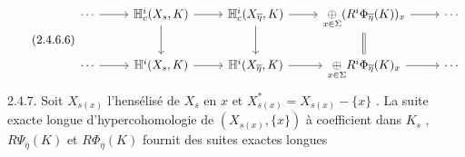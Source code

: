 \begin{equation}\tag{2.4.6.6}
\begin{tikzcd}
\cdots \arrow[r] & \mathbb{H}^i_c(X_s, K) \arrow[r] \arrow[d] & \mathbb{H}^i_c(X_{\overline{\eta}}, K) \arrow[r] \arrow[d] & \underset{x \in \Sigma}{\oplus} (R^i\Phi_{\overline{\eta}}(K))_x \arrow[r] \arrow[d, equal] & \cdots \\
\cdots \arrow[r] & \mathbb{H}^i(X_s, K) \arrow[r] & \mathbb{H}^i(X_{\overline{\eta}}, K) \arrow[r] & \underset{x \in \Sigma}{\oplus} R^i\Phi_{\overline{\eta}}(K)_x \arrow[r] & \cdots
\end{tikzcd}
\end{equation}
2.4.7.   Soit $X_{s(x)}$ l'hensélisé de $X_s$ en $x$ et $X^{*}_{s(x)} = X_{s(x)} - \{x\}$ . La suite exacte longue d'hypercohomologie de $(X_{s(x)}, \{x\})$ à coefficient dans $K_s$ , $R\Psi_{\overline{\eta}}(K)$ et $R\Phi_{\overline{\eta}}(K)$ fournit des suites exactes longues

